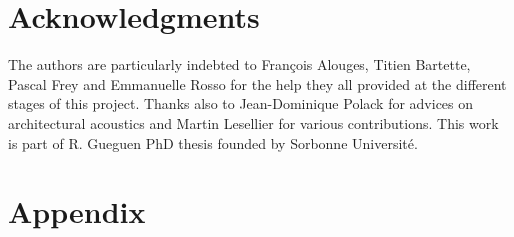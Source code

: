\documentclass[AMA,STIX1COL]{WileyNJD-v2}
\begin{document}
\section*{Acknowledgments}
The authors are particularly indebted to Fran\c{c}ois Alouges, Titien Bartette, Pascal Frey and Emmanuelle Rosso for the help they all provided at the different stages of this project. Thanks also to Jean-Dominique Polack for advices on architectural acoustics and Martin Lesellier for various contributions. This work is part of R. Gueguen PhD thesis founded by Sorbonne Universit\'e.

% 
%

\clearpage

\section*{Appendix}
\end{document}
